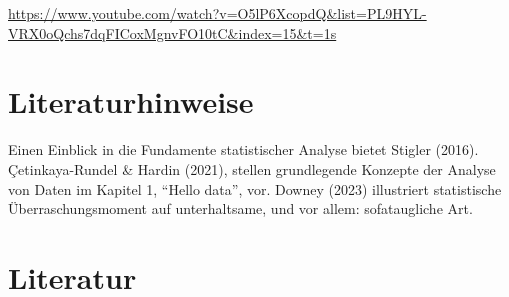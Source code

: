 \documentclass[
  a4paper,
  DIV=11]{scrreprt}
\theoremstyle{definition}
\theoremstyle{definition}
\theoremstyle{definition}
\theoremstyle{remark}
\begin{document}
\url{https://www.youtube.com/watch?v=O5lP6XcopdQ&list=PL9HYL-VRX0oQchs7dqFICoxMgnvFO10tC&index=15&t=1s}

\section{Literaturhinweise}\label{literaturhinweise}

Einen Einblick in die Fundamente statistischer Analyse bietet Stigler
(2016). Çetinkaya-Rundel \& Hardin (2021), stellen grundlegende Konzepte
der Analyse von Daten im Kapitel 1, ``Hello data'', vor. Downey (2023)
illustriert statistische Überraschungsmoment auf unterhaltsame, und vor
allem: sofataugliche Art.

\section*{Literatur}\label{literatur-1}
\end{document}
